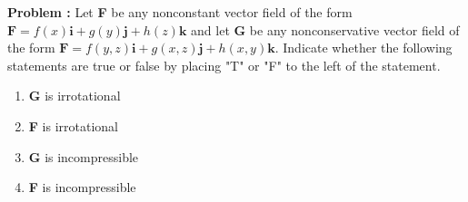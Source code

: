 {\bf Problem :} Let {\bf  F } be any nonconstant vector field of the form \(\mathbf{F} = f \left( x \right)
\mathbf{i} + g \left( y \right) \mathbf{j} + h \left( z \right) \mathbf{k}\) and let
{\bf  G } be any nonconservative vector field of the form \(\mathbf{F} = f \left( y, z \right)
\mathbf{i} + g \left( x, z \right) \mathbf{j} + h \left( x, y \right) \mathbf{k}\).
Indicate whether the following statements are true or false by placing "T" or "F" to
the left of the statement. \leavevmode\\\relax 

\par\begin{enumerate}
\item[\mbox{\parbox[t]{3ex}{\hrulefill}}1.] {\bf  G } is irrotational
\item[\mbox{\parbox[t]{3ex}{\hrulefill}}2.] {\bf  F } is irrotational
\item[\mbox{\parbox[t]{3ex}{\hrulefill}}3.] {\bf  G } is incompressible
\item[\mbox{\parbox[t]{3ex}{\hrulefill}}4.] {\bf  F } is incompressible
\end{enumerate}
